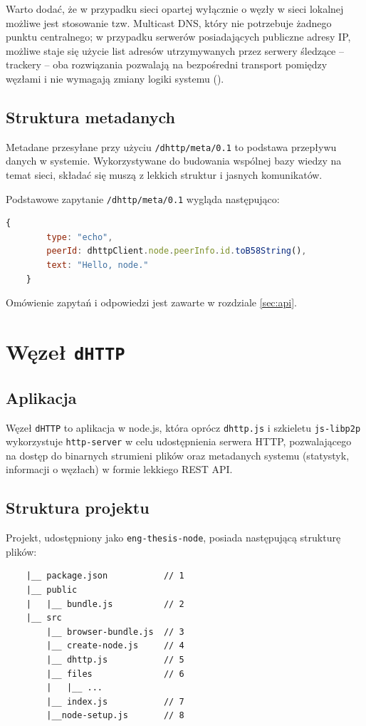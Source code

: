 Warto dodać, że w przypadku sieci opartej wyłącznie o węzły w sieci lokalnej możliwe jest stosowanie tzw. Multicast DNS, który nie potrzebuje żadnego punktu centralnego; w przypadku serwerów posiadających publiczne adresy IP, możliwe staje się użycie list adresów utrzymywanych przez serwery śledzące -- trackery -- oba rozwiązania pozwalają na bezpośredni transport pomiędzy węzłami i nie wymagają zmiany logiki systemu (\cite{discoverylibp2p}).

\subsection{Struktura metadanych}
\label{sub:metadata}

Metadane przesyłane przy użyciu \texttt{/dhttp/meta/0.1} to podstawa przepływu danych w systemie. Wykorzystywane do budowania wspólnej bazy wiedzy na temat sieci, składać się muszą z lekkich struktur i jasnych komunikatów.

Podstawowe zapytanie \texttt{/dhttp/meta/0.1} wygląda następująco:

\begin{lstlisting}[language=javascript]
    {
        type: "echo",
        peerId: dhttpClient.node.peerInfo.id.toB58String(),
        text: "Hello, node."
    }
\end{lstlisting}

Omówienie zapytań i odpowiedzi jest zawarte w rozdziale \ref{sec:api}.




\section{Węzeł \texttt{dHTTP}}

\subsection{Aplikacja}

Węzeł \texttt{dHTTP} to aplikacja w node.js, która oprócz \texttt{dhttp.js} i szkieletu \texttt{js-libp2p} wykorzystuje \texttt{http-server} w celu udostępnienia serwera HTTP, pozwalającego na dostęp do binarnych strumieni plików oraz metadanych systemu (statystyk, informacji o węzłach) w formie lekkiego REST API.

\subsection{Struktura projektu}
\label{sec:transportAlgorithm}
Projekt, udostępniony jako \texttt{eng-thesis-node}, posiada następującą strukturę plików:
\begin{lstlisting}
    |__ package.json           // 1
    |__ public
    |   |__ bundle.js          // 2
    |__ src
        |__ browser-bundle.js  // 3
        |__ create-node.js     // 4
        |__ dhttp.js           // 5
        |__ files              // 6
        |   |__ ...
        |__ index.js           // 7
        |__node-setup.js       // 8
\end{lstlisting}

